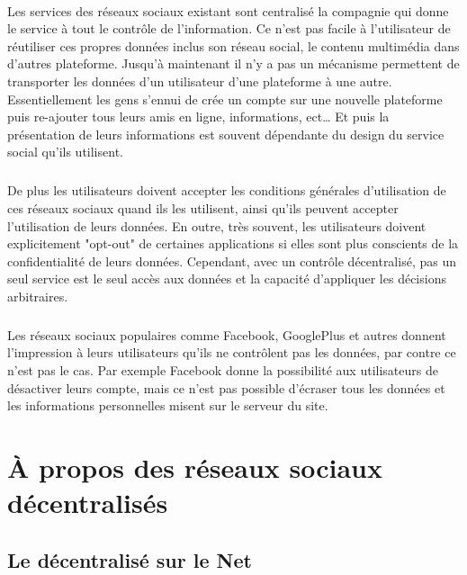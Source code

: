 \paragraph{}
Les services des réseaux sociaux existant sont centralisé la compagnie qui donne le service à tout le contrôle de l'information. Ce n'est pas facile à l'utilisateur de réutiliser ces propres données inclus son réseau social, le contenu multimédia dans d'autres plateforme. Jusqu'à maintenant il n'y a pas un mécanisme permettent de transporter les données d'un utilisateur d'une plateforme à une autre.
Essentiellement les gens s'ennui de crée un compte sur une nouvelle plateforme puis re-ajouter tous leurs amis en ligne, informations, ect… 
Et puis la présentation de leurs informations est souvent dépendante du design du service social qu'ils utilisent.
\subparagraph{}
De plus les utilisateurs doivent accepter les conditions générales d'utilisation de ces réseaux sociaux quand ils les utilisent, ainsi qu'ils peuvent accepter l'utilisation de leurs données. En outre, très souvent, les utilisateurs doivent explicitement "opt-out" de certaines applications si elles sont plus conscients de la confidentialité de leurs données. Cependant, avec un contrôle décentralisé, pas un seul service est le seul accès aux données et la capacité d'appliquer les décisions arbitraires.
\subparagraph{}
Les réseaux sociaux populaires comme Facebook, GooglePlus et autres donnent l'impression à leurs utilisateurs qu'ils ne contrôlent pas les données, par contre ce n'est pas le cas. Par exemple Facebook donne la possibilité aux utilisateurs de désactiver leurs compte, mais ce n'est pas possible d'écraser tous les données et les informations personnelles misent sur le serveur du site.
\newpage
\section{\`A propos des réseaux sociaux décentralisés}
\subsection{Le décentralisé sur le Net }
